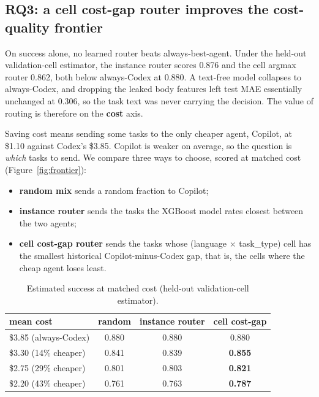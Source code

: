 \documentclass[sigconf,nonacm]{acmart}
\begin{document}
\subsection{RQ3: a cell cost-gap router improves the cost-quality frontier}\label{sec:rq3}

On success alone, no learned router beats always-best-agent. Under the held-out validation-cell estimator, the instance router scores 0.876 and the cell argmax router 0.862, both below always-Codex at 0.880. A text-free model collapses to always-Codex, and dropping the leaked body features left test MAE essentially unchanged at 0.306, so the task text was never carrying the decision. The value of routing is therefore on the \textbf{cost} axis.

Saving cost means sending some tasks to the only cheaper agent, Copilot, at \$1.10 against Codex's \$3.85. Copilot is weaker on average, so the question is \emph{which} tasks to send. We compare three ways to choose, scored at matched cost (Figure~\ref{fig:frontier}):
\begin{itemize}
  \item \textbf{random mix} sends a random fraction to Copilot;
  \item \textbf{instance router} sends the tasks the XGBoost model rates closest between the two agents;
  \item \textbf{cell cost-gap router} sends the tasks whose (language $\times$ task\_type) cell has the smallest historical Copilot-minus-Codex gap, that is, the cells where the cheap agent loses least.
\end{itemize}

\begin{table}[h]
  \centering
  \caption{Estimated success at matched cost (held-out validation-cell estimator).}
  \begin{tabular}{lccc}
    \toprule
    mean cost & random & instance router & cell cost-gap \\
    \midrule
    \$3.85 (always-Codex) & 0.880 & 0.880 & 0.880 \\
    \$3.30 (14\% cheaper) & 0.841 & 0.839 & \textbf{0.855} \\
    \$2.75 (29\% cheaper) & 0.801 & 0.803 & \textbf{0.821} \\
    \$2.20 (43\% cheaper) & 0.761 & 0.763 & \textbf{0.787} \\
    \bottomrule
  \end{tabular}
\end{table}
\end{document}
